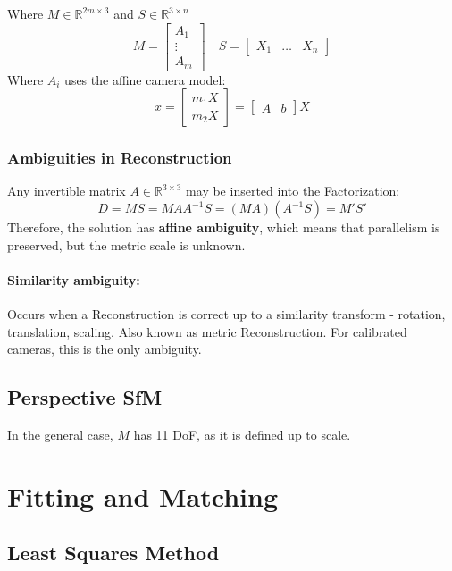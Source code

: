 \documentclass[8pt, a4paper, landscape, includeheadfoot]{extarticle}
\begin{document}
\begin{multicols*}{4}
	Where $M \in \mathbb{R}^{2m \times 3}$ and $S \in \mathbb{R}^{3\times n}$
	$$
		M = \begin{bmatrix}
			A_1 \\ \vdots \\ A_m
		\end{bmatrix} \quad S = \begin{bmatrix}
			X_1 & \hdots & X_n
		\end{bmatrix}
	$$
	Where $A_i$ uses the affine camera model:
	$$
		x = \begin{bmatrix}
			m_1 X \\ m_2X
		\end{bmatrix} = \begin{bmatrix}
			A & b
		\end{bmatrix}X
	$$

	\subsubsection{Ambiguities in Reconstruction}{}
	Any invertible matrix $A\in\mathbb{R}^{3 \times 3}$ may be inserted into the Factorization:
	$$
		D = MS = MAA^{-1}S = (MA)(A^{-1}S) = M'S'
	$$
	Therefore, the solution has \textbf{affine ambiguity}, which means that parallelism is preserved, but the metric scale is unknown.

	\paragraph{Similarity ambiguity:} Occurs when a Reconstruction is correct up to a similarity transform - rotation, translation, scaling. Also known as metric Reconstruction. For calibrated cameras, this is the only ambiguity.

	\subsection{Perspective SfM}
	In the general case, $M$ has 11 DoF, as it is defined up to scale.

	\section{Fitting and Matching}
	\subsection{Least Squares Method}

\end{multicols*}
\end{document}
